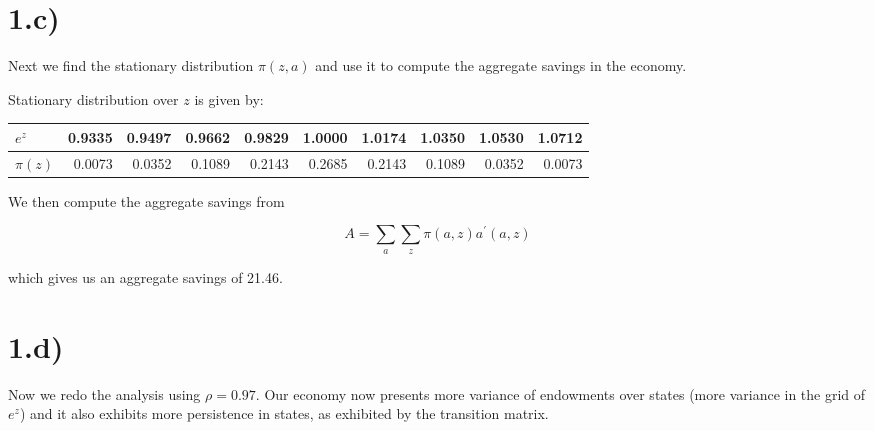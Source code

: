 \documentclass{article}
\begin{document}
\section*{1.c)}

Next we find the stationary distribution $\pi(z, a)$ and use it to compute the aggregate savings in the
economy.

Stationary distribution over $z$ is given by:

\begin{scriptsize}
\begin{tabular}{l|rrrrrrrrr}
   $e^z$  & 0.9335 &   0.9497  &  0.9662  &  0.9829  &  1.0000   & 1.0174 &   1.0350 &   1.0530  &  1.0712 \\ \hline
   $\pi(z)$ & 0.0073 &  0.0352 &  0.1089 &  0.2143 & 0.2685  &  0.2143  &  0.1089 &   0.0352 & 0.0073 \\
\end{tabular}
\end{scriptsize}

We then compute the aggregate savings from

	$$ A = \sum_a \sum_z \pi(a,z) a^\prime(a,z) $$

which gives us an aggregate savings of 21.46.

\section*{1.d)}

Now we redo the analysis using $\rho = 0.97$. Our economy now presents more
variance of endowments over states (more variance in the grid of $e^z$) and it
also exhibits more persistence in states, as exhibited by the transition
matrix.
\end{document}
